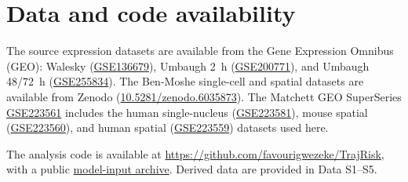\section*{Data and code availability}

The source expression datasets are available from the Gene Expression Omnibus (GEO): Walesky (\href{https://www.ncbi.nlm.nih.gov/geo/query/acc.cgi?acc=GSE136679}{GSE136679}), Umbaugh 2~h (\href{https://www.ncbi.nlm.nih.gov/geo/query/acc.cgi?acc=GSE200771}{GSE200771}), and Umbaugh 48/72~h (\href{https://www.ncbi.nlm.nih.gov/geo/query/acc.cgi?acc=GSE255834}{GSE255834}). The Ben-Moshe single-cell and spatial datasets are available from Zenodo (\href{https://doi.org/10.5281/zenodo.6035873}{10.5281/zenodo.6035873}). The Matchett GEO SuperSeries \href{https://www.ncbi.nlm.nih.gov/geo/query/acc.cgi?acc=GSE223561}{GSE223561} includes the human single-nucleus (\href{https://www.ncbi.nlm.nih.gov/geo/query/acc.cgi?acc=GSE223581}{GSE223581}), mouse spatial (\href{https://www.ncbi.nlm.nih.gov/geo/query/acc.cgi?acc=GSE223560}{GSE223560}), and human spatial (\href{https://www.ncbi.nlm.nih.gov/geo/query/acc.cgi?acc=GSE223559}{GSE223559}) datasets used here.

The analysis code is available at \url{https://github.com/favourigwezeke/TrajRisk}, with a public \href{https://github.com/favourigwezeke/TrajRisk/releases/download/v0.1.0-rc1/TrajRisk_frozen_inputs.zip}{model-input archive}. Derived data are provided in Data S1--S5.
